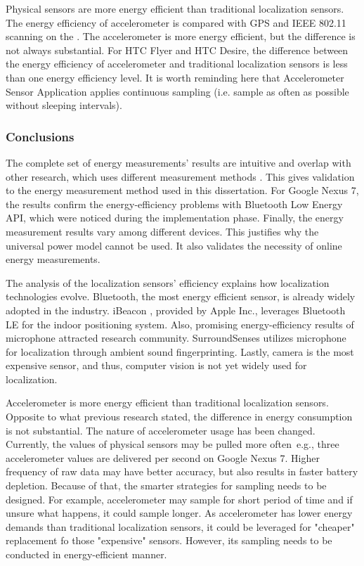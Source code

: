 
Physical sensors are more energy efficient than traditional localization sensors. The energy efficiency of accelerometer is compared with GPS and IEEE 802.11 scanning on the . The accelerometer is more energy efficient, but the difference is not always substantial. For HTC Flyer and HTC Desire, the difference between the energy efficiency of accelerometer and traditional localization sensors is less than one energy efficiency level. It is worth reminding here that Accelerometer Sensor Application applies continuous sampling (i.e. sample as often as possible without sleeping intervals).
	

\subsubsection{Conclusions}
\hspace{10pt} The complete set of energy measurements' results are intuitive and overlap with other research, which uses different measurement methods \cite{constandache:localization} \cite{wang:eemss} \cite{chon:smartdc}. This gives validation to the energy measurement method used in this dissertation. For Google Nexus 7, the results confirm the energy-efficiency problems with Bluetooth Low Energy API, which were noticed during the implementation phase. Finally, the energy measurement results vary among different devices. This justifies why the universal power model cannot be used. It also validates the necessity of online energy measurements. 

The analysis of the localization sensors' efficiency explains how localization technologies evolve. Bluetooth, the most energy efficient sensor, is already widely adopted in the industry. iBeacon \cite{apple:ibeacon}, provided by Apple Inc.,  leverages Bluetooth LE for the indoor positioning system. Also, promising energy-efficiency results of microphone attracted research community. SurroundSenses \cite{azizyan:surroundsense} utilizes microphone for localization through ambient sound fingerprinting. Lastly, camera is the most expensive sensor, and thus, computer vision is not yet widely used for localization.

Accelerometer is more energy efficient than traditional localization sensors. Opposite to what previous research\cite{benabdesslem:senseless} stated, the difference in energy consumption is not substantial. The nature of accelerometer usage has been changed. Currently, the values of physical sensors may be pulled more often\ e.g., three accelerometer values are delivered per second on Google Nexus 7. Higher frequency of raw data may have better accuracy, but also results in faster battery depletion.  Because of that, the smarter strategies for sampling needs to be designed. For example, accelerometer may sample for short period of time and if unsure what happens, it could sample longer. As accelerometer has lower energy demands than traditional localization sensors, it could be leveraged for "cheaper" replacement fo those "expensive" sensors. However, its sampling needs to be conducted in energy-efficient manner. 


